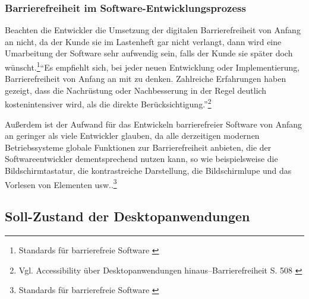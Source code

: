 


\subsubsection{Barrierefreiheit im Software-Entwicklungsprozess}
Beachten die Entwickler die Umsetzung der digitalen Barrierefreiheit von Anfang an nicht, da der Kunde sie im Lastenheft gar nicht verlangt, dann wird eine Umarbeitung der Software sehr aufwendig sein, falls der Kunde sie später doch wünscht.\footnote{Standards für barrierefreie Software \cite{DEVINSIDER}}"`Es empfiehlt sich, bei jeder neuen Entwicklung oder Implementierung, Barrierefreiheit von Anfang an mit zu denken. Zahlreiche Erfahrungen haben gezeigt, dass die Nachrüstung oder Nachbesserung in der Regel deutlich kostenintensiver wird, als die direkte Berücksichtigung."'\footnote{Vgl. Accessibility über Desktopanwendungen hinaus–Barrierefreiheit S. 508 \cite{buhler2017accessibility}}
 
Außerdem ist der Aufwand für das Entwickeln barrierefreier Software von Anfang an geringer als viele Entwickler glauben, da alle  derzeitigen modernen Betriebssysteme globale Funktionen zur Barrierefreiheit anbieten, die der Softwareentwickler dementsprechend nutzen kann, so wie beispielsweise die Bildschirmtastatur, die kontrastreiche Darstellung, die Bildschirmlupe und das Vorlesen von Elementen usw..\footnote{Standards für barrierefreie Software \cite{DEVINSIDER}}

\subsection{Soll-Zustand der Desktopanwendungen}
\label{subsec: Soll-Zustand der Desktopanwendungen}

